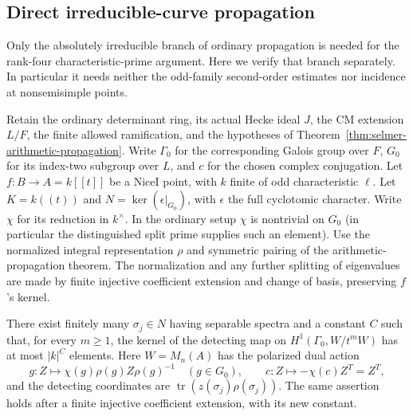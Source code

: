 \subsection{Direct irreducible-curve propagation}
\label{subsec:selmer-p1-direct}

Only the absolutely irreducible branch of ordinary propagation is
needed for the rank-four characteristic-prime argument. Here we
verify that branch separately. In particular it needs neither the
odd-family second-order estimates nor incidence at nonsemisimple
points.

Retain the ordinary determinant ring, its actual Hecke ideal $J$,
the CM extension $L/F$, the finite allowed ramification, and the
hypotheses of Theorem~\ref{thm:selmer-arithmetic-propagation}.
Write $\Gamma_0$ for the corresponding Galois group over $F$,
$G_0$ for its index-two subgroup over $L$, and $c$ for the chosen
complex conjugation. Let $f:B\to A=k[[t]]$ be a NiceI point, with
$k$ finite of odd characteristic $\ell$. Let $K=k((t))$ and
$N=\ker(\epsilon|_{G_0})$, with $\epsilon$ the full cyclotomic
character. Write $\chi$ for its reduction in $k^\times$.
In the ordinary setup $\chi$ is nontrivial on $G_0$ (in particular
the distinguished split prime supplies such an element).
Use the normalized integral representation $\rho$ and symmetric
pairing of the arithmetic-propagation theorem. The normalization
and any further splitting of eigenvalues are made by finite
injective coefficient extension and change of basis, preserving
$f$'s kernel.

\begin{lemma}
\label{lem:selmer-p1-direct-detection}
There exist finitely many $\sigma_j\in N$ having separable spectra
and a constant $C$ such that, for every $m\geq1$, the kernel of
the detecting map on $H^1(\Gamma_0,W/t^mW)$ has at most $|k|^C$
elements. Here $W=M_n(A)$ has the polarized dual action
\[
 g:Z\mapsto\chi(g)\rho(g)Z\rho(g)^{-1}\quad(g\in G_0),
 \qquad c:Z\mapsto-\chi(c)Z^T=Z^T ,
\]
and the detecting coordinates are
$\operatorname{tr}(z(\sigma_j)\rho(\sigma_j))$.
The same assertion holds after a finite injective coefficient
extension, with its new constant.
\end{lemma}

